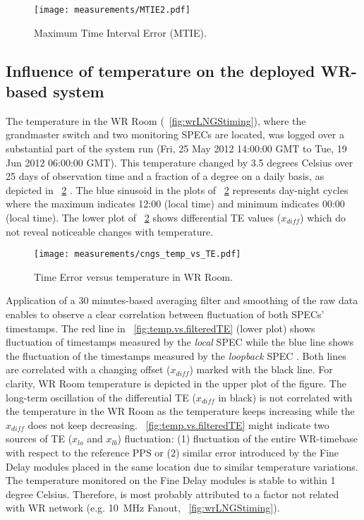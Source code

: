 \begin{figure}[!t]
\centering
\texttt{[image: measurements/MTIE2.pdf]}
\caption{Maximum Time Interval Error (MTIE).}
\label{fig:MTIE}
\end{figure}

\subsection{Influence of temperature on the deployed WR-based system}

The temperature in the WR Room (\figurename~\ref{fig:wrLNGStiming}), where the grandmaster
switch and two monitoring SPECs are located, was logged over a substantial
part of the system run (Fri, 25 May 2012 14:00:00 GMT to Tue, 19 Jun 2012 06:00:00 GMT).
This temperature changed by 3.5 degrees Celsius over 25 days of observation time and 
a fraction of a degree on a daily basis, as depicted in \figurename~\ref{fig:temp.vs.TE} 
. 
The blue sinusoid in the plots of \figurename~\ref{fig:temp.vs.TE} represents day-night cycles where the maximum indicates 
12:00 (local time) and minimum indicates 00:00 (local time). The lower plot of \figurename~\ref{fig:temp.vs.TE}
shows differential TE values ($x_{diff}$) which do not reveal noticeable changes with temperature. 

\begin{figure}[!t]
\centering
\texttt{[image: measurements/cngs\_temp\_vs\_TE.pdf]}
\caption{Time Error versus temperature in WR Room.}
\label{fig:temp.vs.TE}
\end{figure}

Application of a 30 minutes-based averaging filter and smoothing of the raw data 
 enables to observe 
a clear correlation between fluctuation of both SPECs' timestamps. The red line in 
\figurename~\ref{fig:temp.vs.filteredTE} (lower plot) shows fluctuation of timestamps measured by the 
\textit{local} SPEC  while the blue line shows the fluctuation of the timestamps measured by the 
\textit{loopback} SPEC . Both lines
are correlated with a changing offset ($x_{diff}$) marked with the black line. For clarity,
WR Room temperature is depicted in the upper plot of the figure. The 
long-term oscillation of the differential TE ($x_{diff}$ in black) is not correlated 
with the temperature in the WR Room as the temperature keeps increasing while the 
$x_{diff}$ does not keep decreasing.
\figurename~\ref{fig:temp.vs.filteredTE} might indicate two sources of TE 
($x_{lo}$ and $x_{lb}$) fluctuation: (1) fluctuation of the entire WR-timebase with respect
to the reference PPS or (2) similar error introduced by the Fine Delay modules placed in the 
same location due to similar temperature variations.
The temperature monitored on the Fine Delay modules is stable to within 1 degree Celsius. Therefore,
 is most probably attributed to a factor not 
related with WR network (e.g. 10~MHz Fanout, \figurename~\ref{fig:wrLNGStiming}).

